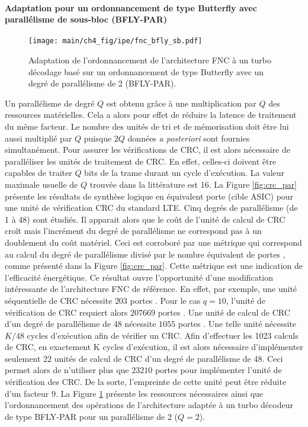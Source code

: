 \paragraph*{Adaptation pour un ordonnancement de type Butterfly avec parallélisme de sous-bloc (BFLY-PAR)}
\begin{figure}[!ht]
	\centering
	\texttt{[image: main/ch4\_fig/ipe/fnc\_bfly\_sb.pdf]}
	\caption{Adaptation de l'ordonnancement de l'architecture FNC à un turbo décodage basé sur un ordonnancement de type 
	Butterfly avec un degré de parallélisme de 2 (BFLY-PAR). \label{fig:fnc_bfly_sb}}
\end{figure}
Un parallélisme de degré $Q$ est obtenu grâce à une multiplication par $Q$ des ressources 
matérielles. Cela a alors pour effet de réduire la latence de traitement du même facteur. Le nombre 
des unités de tri et
de mémorisation doit être lui aussi multiplié par $Q$ puisque $2Q$ données \textit{a posteriori} sont fournies 
simultanément. Pour assurer les vérifications de CRC, il est alors nécessaire de paralléliser les unités de traitement 
de CRC. En effet, celles-ci doivent être capables de traiter $Q$ bits de la trame durant un cycle d'exécution. La valeur 
maximale usuelle de $Q$ trouvée dans la littérature est 16. La Figure \ref{fig:crc_par} présente les résultats de synthèse 
logique
en équivalent porte (cible ASIC) pour une unité de vérification CRC du standard LTE. Cinq degrés de parallélisme (de 1 à 48)
sont étudiés.
Il apparait alors que le coût de l'unité de calcul de CRC croît mais l'incrément du degré de parallélisme ne correspond pas à un 
doublement du coût matériel. Ceci est corroboré par une métrique qui correspond au calcul du degré de parallélisme divisé par le nombre équivalent
de portes , comme présenté dans la Figure \ref{fig:crc_par}. Cette métrique est une indication
de l'efficacité énergétique. 
Ce résultat ouvre l'opportunité d'une modification intéressante de l'architecture FNC de référence. En effet, par 
exemple, une unité séquentielle de CRC nécessite $203$ portes . Pour le cas $q=10$, l'unité de vérification 
de CRC requiert alors $207669$ portes . Une unité de calcul de CRC d'un degré de parallélisme de 48 nécessite 
$1055$ portes . Une telle unité nécessite $K/48$ cycles d'exécution afin de vérifier un CRC. Afin d'effectuer
les 1023 calculs de CRC, en exactement K cycles d'exécution, il est alors nécessaire d'implémenter seulement 22 unités
de calcul de CRC d'un degré de parallélisme de 48. Ceci permet alors de n'utiliser plus que $23210$ portes 
pour implémenter l'unité de vérification des CRC. De  la sorte, l'empreinte de cette unité peut être réduite d'un facteur
9.
La Figure \ref{fig:fnc_bfly_sb} présente les ressources nécessaires ainsi que l'ordonnancement des 
opérations de l'architecture adaptée à un turbo décodeur de type BFLY-PAR pour un parallélisme de 2 ($Q=2$).

